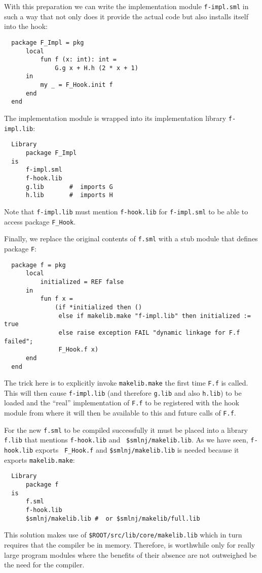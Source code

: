 With this preparation we can write the implementation module {\tt f-impl.sml}
in such a way that not only does it provide the actual
code but also installs itself into the hook:
\begin{verbatim}
  package F_Impl = pkg
      local
          fun f (x: int): int =
              G.g x + H.h (2 * x + 1)
      in
          my _ = F_Hook.init f
      end
  end
\end{verbatim}
\noindent The implementation module is wrapped into its implementation
library {\tt f-impl.lib}:
\begin{verbatim}
  Library
      package F_Impl
  is
      f-impl.sml
      f-hook.lib
      g.lib       #  imports G 
      h.lib       #  imports H 
\end{verbatim}
\noindent Note that {\tt f-impl.lib} must mention {\tt f-hook.lib} for
{\tt f-impl.sml} to be able to access package {\tt F\_Hook}.

Finally, we replace the original contents of {\tt f.sml} with a stub
module that defines package {\tt F}:
\begin{verbatim}
  package f = pkg
      local
          initialized = REF false
      in
          fun f x =
              (if *initialized then ()
               else if makelib.make "f-impl.lib" then initialized := true
               else raise exception FAIL "dynamic linkage for F.f failed";
               F_Hook.f x)
      end
  end
\end{verbatim}
\noindent The trick here is to explicitly invoke {\tt makelib.make} the
first time {\tt F.f} is called.  This will then cause {\tt f-impl.lib}
(and therefore {\tt g.lib} and also {\tt h.lib}) to be loaded and the
``real'' implementation of {\tt F.f} to be registered with the hook
module from where it will then be available to this and future calls
of {\tt F.f}.

For the new {\tt f.sml} to be compiled successfully it must be placed
into a library {\tt f.lib} that mentions {\tt f-hook.lib} and {\tt
\$smlnj/makelib.lib}.  As we have seen, {\tt f-hook.lib} exports {\tt
F\_Hook.f} and {\tt \$smlnj/makelib.lib} is needed because it exports
{\tt makelib.make}:

\begin{verbatim}
  Library
      package f
  is
      f.sml
      f-hook.lib
      $smlnj/makelib.lib #  or $smlnj/makelib/full.lib 
\end{verbatim}

  This solution makes use of {\tt \$ROOT/src/lib/core/makelib.lib}
which in turn requires that the compiler be in memory.  Therefore,
is worthwhile only for really large program modules where the benefits
of their absence are not outweighed be the need for the compiler.
